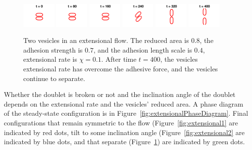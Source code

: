 \documentclass[aps,prl,twocolumn,showpacs,amsmath,amssymb]{revtex4-1}
\begin{document}
\begin{figure}[htp]
  \includegraphics[width = 0.15\textwidth]{figs/extensional_adR4em1adS7em1Chi1em1_ra080_image01.png}
  \includegraphics[width = 0.15\textwidth]{figs/extensional_adR4em1adS7em1Chi1em1_ra080_image02.png}
  \includegraphics[width = 0.15\textwidth]{figs/extensional_adR4em1adS7em1Chi1em1_ra080_image03.png}
  \includegraphics[width = 0.15\textwidth]{figs/extensional_adR4em1adS7em1Chi1em1_ra080_image04.png}
  \includegraphics[width = 0.15\textwidth]{figs/extensional_adR4em1adS7em1Chi1em1_ra080_image05.png}
  \includegraphics[width = 0.15\textwidth]{figs/extensional_adR4em1adS7em1Chi1em1_ra080_image06.png}
  \caption{\label{fig:extensional3} Two vesicles in an extensional flow.
  The reduced area is $0.8$, the adhesion strength is $0.7$, and the
  adhesion length scale is $0.4$, extensional rate is $\chi = 0.1$.
  After time $t=400$, the vesicles extensional rate has overcome the
  adhesive force, and the vesicles continue to separate.}
\end{figure}

Whether the doublet is broken or not and the inclination angle of the
doublet depends on the extensional rate and the vesicles' reduced area.
A phase diagram of the steady-state configuration is in
Figure~\ref{fig:extensionalPhaseDiagram}.  Final configurations that
remain symmetric to the flow (Figure~\ref{fig:extensional1} are
indicated by red dots, tilt to some inclination angle
(Figure~\ref{fig:extensional2} are indicated by blue dots, and that
separate (Figure~\ref{fig:extensional3}) are indicated by green dots.
\end{document}
